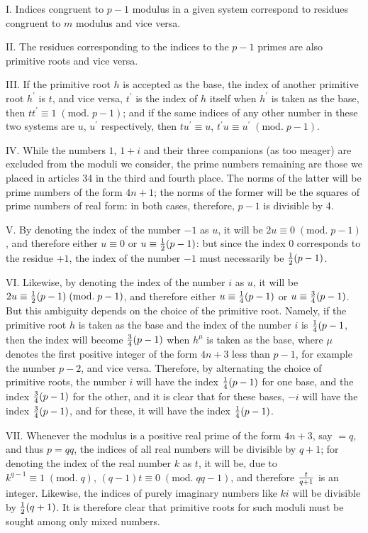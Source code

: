 \documentclass[twoside,12pt, showframe]{memoir}
\renewcommand{\pmod}[1]{\;(\textrm{mod.}\;#1)}
\let\oldfrac\frac
\def\frac#1#2{\mathchoice{\tfrac{#1}{#2}}{\oldfrac{#1}{#2}}{\genfrac{}{}{}{2}{#1}{#2\mathstrut}}{\genfrac{}{}{}{3}{#1}{#2\mathstrut}}}
\begin{document}
I. Indices congruent to \(p-1\) modulus in a given system correspond to residues congruent to \(m\) modulus and vice versa.

II. The residues corresponding to the indices to the \(p-1\) primes are also primitive roots and vice versa.

III. If the primitive root \(h\) is accepted as the base, the index of another primitive root \(h^{\prime}\) is \(t\), and vice versa, \(t^{\prime}\) is the index of \(h\) itself when \(h^{\prime}\) is taken as the base, then \(t t^{\prime} \equiv 1\pmod{p-1}\); and if the same indices of any other number in these two systems are \(u\), \(u^{\prime}\) respectively, then \(t u^{\prime} \equiv u\), \(t^{\prime} u \equiv u^{\prime}\pmod{p-1}\).

IV. While the numbers \(1\), \(1+i\) and their three companions (as too meager) are excluded from the moduli we consider, the prime numbers remaining are those we placed in articles 34 in the third and fourth place. The norms of the latter will be prime numbers of the form \(4n+1\); the norms of the former will be the squares of prime numbers of real form: in both cases, therefore, \(p-1\) is divisible by 4.
%

\(\text{V.}\) By denoting the index of the number \(-1\) as \(u\), it will be \(2 u \equiv 0\pmod{p-1}\), and therefore either \(u \equiv 0\) or \(u \equiv \frac{1}{2}(p-1)\): but since the index 0 corresponds to the residue \(+1\), the index of the number \(-1\) must necessarily be \(\frac{1}{2}(p-1)\).

\(\text{VI.}\) Likewise, by denoting the index of the number \(i\) as \(u\), it will be \(2 u \equiv \frac{1}{2}(p-1) \pmod{p-1}\), and therefore either \(u \equiv \frac{1}{4}(p-1)\) or \(u \equiv \frac{3}{4}(p-1)\). But this ambiguity depends on the choice of the primitive root. Namely, if the primitive root \(h\) is taken as the base and the index of the number \(i\) is \(\frac{1}{4}(p-1\), then the index will become \(\frac{3}{4}(p-1)\) when \(h^{\mu}\) is taken as the base, where \(\mu\) denotes the first positive integer of the form \(4 n+3\) less than \(p-1\), for example the number \(p-2\), and vice versa. Therefore, by alternating the choice of primitive roots, the number \(i\) will have the index \(\frac{1}{4}(p-1)\) for one base, and the index \(\frac{3}{4}(p-1)\) for the other, and it is clear that for these bases, \(-i\) will have the index \(\frac{3}{4}(p-1)\), and for these, it will have the index \(\frac{1}{4}(p-1)\).

\(\text{VII.}\) Whenever the modulus is a positive real prime of the form \(4 n+3\), say \(=q\), and thus \(p=q q\), the indices of all real numbers will be divisible by \(q+1\); for denoting the index of the real number \(k\) as \(t\), it will be, due to \(k^{q-1} \equiv 1\pmod{q}\), \((q-1) t \equiv 0\pmod{q q-1}\), and therefore \(\frac{t}{q+1}\) is an integer. Likewise, the indices of purely imaginary numbers like \(ki\) will be divisible by \(\frac{1}{2}(q+1)\). It is therefore clear that primitive roots for such moduli must be sought among only mixed numbers.
\end{document}
